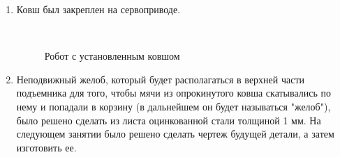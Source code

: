 \begin{enumerate}
\begin{enumerate}
        \item Ковш был закреплен на сервоприводе.
        \begin{figure}[H]
        	\begin{minipage}[h]{0.2\linewidth}
        		\center  
        	\end{minipage}
        	\begin{minipage}[h]{0.6\linewidth}
        		\caption{Робот с установленным ковшом}
        	\end{minipage}
        \end{figure}
		
        \item Неподвижный желоб, который будет располагаться в верхней части подъемника для того, чтобы мячи из опрокинутого ковша скатывались по нему  и попадали в корзину (в дальнейшем он будет называться "желоб"), было решено сделать из листа оцинкованной стали толщиной 1 мм. На следующем занятии было решено сделать чертеж будущей детали, а затем изготовить ее.
        

\end{enumerate}
\end{enumerate}
